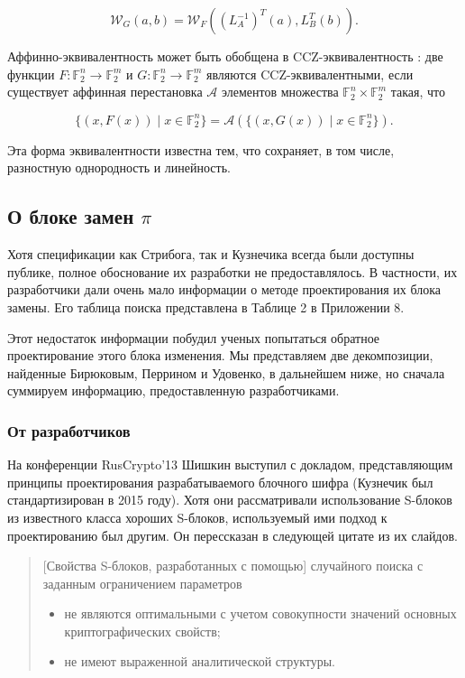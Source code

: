 \[
\mathcal{W}_G(a, b) = \mathcal{W}_F((L_A^{-1})^T(a), L_B^T(b)).
\]

Аффинно-эквивалентность может быть обобщена в CCZ-эквивалентность \cite{CCZ98}: две функции \( F: \mathbb{F}_2^n \rightarrow \mathbb{F}_2^m \) и \( G: \mathbb{F}_2^n \rightarrow \mathbb{F}_2^m \) являются CCZ-эквивалентными, если существует аффинная перестановка \( \mathcal{A} \) элементов множества \(\mathbb{F}_2^n \times \mathbb{F}_2^m\) такая, что

\[
\{(x, F(x)) \mid x \in \mathbb{F}_2^n \} = \mathcal{A}(\{(x, G(x)) \mid x \in \mathbb{F}_2^n \}).
\]

Эта форма эквивалентности известна тем, что сохраняет, в том числе, разностную однородность и линейность.

\subsection{О блоке замен \(\pi\)}

Хотя спецификации как Стрибога, так и Кузнечика всегда были доступны публике, полное обоснование их разработки не предоставлялось. В частности, их разработчики дали очень мало информации о методе проектирования их блока замены. Его таблица поиска представлена в Таблице 2 в Приложении 8.

Этот недостаток информации побудил ученых попытаться обратное проектирование этого блока изменения. Мы представляем две декомпозиции, найденные Бирюковым, Перрином и Удовенко, в дальнейшем ниже, но сначала суммируем информацию, предоставленную разработчиками.

\subsubsection{От разработчиков}

На конференции RusCrypto'13 \cite{Shi13} Шишкин выступил с докладом, представляющим принципы проектирования разрабатываемого блочного шифра (Кузнечик был стандартизирован в 2015 году). Хотя они рассматривали использование S-блоков из известного класса хороших S-блоков, используемый ими подход к проектированию был другим. Он перессказан в следующей цитате из их слайдов.

\begin{quote}
[Свойства S-блоков, разработанных с помощью] случайного поиска с заданным ограничением параметров
\begin{itemize}
        \item не являются оптимальными с учетом совокупности значений основных криптографических свойств;
        \item не имеют выраженной аналитической структуры.
\end{itemize}
\end{quote}

